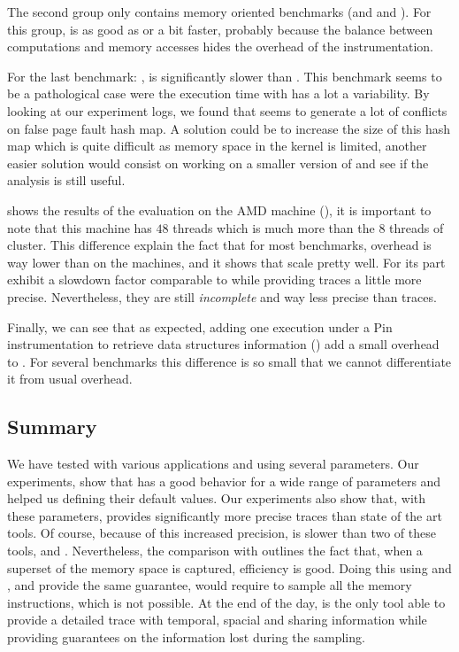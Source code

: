 The second group only contains memory oriented benchmarks (\DC and \FT and
\IS). For this group, \Moca is as good as \TABARNAC or a bit faster, probably
because the balance between computations and memory accesses hides the
overhead of the instrumentation.

For the last benchmark: \MG, \Moca is significantly slower than \TABARNAC. This benchmark
seems to be a pathological case were the execution time with \Moca has a lot a
variability. By looking at our experiment logs, we found that \MG seems to
generate a lot of conflicts on \Moca false page fault hash map. A solution
could be to increase the size of this hash map which is quite difficult as
memory space in the kernel is limited, another easier solution would consist on
working on a smaller version of \MG and see if the analysis is still useful.

 shows the results of the evaluation on the AMD machine
(\Stremi), it is important to note that this machine has $48$ threads which
is much more than the $8$ threads of \Edel cluster. This difference explain
the fact that for most benchmarks, \Moca overhead is way lower than on the
\Edel machines, and it shows that \Moca scale pretty well.
For its part \MemProf exhibit a slowdown factor comparable to \Mitos while
providing traces a little more precise. Nevertheless, they are still \emph{incomplete} and
way less precise than \Moca traces.

Finally, we can see that as expected, adding one execution under a Pin
instrumentation to retrieve data structures information (\MocaPin) add a small overhead
to \Moca. For several benchmarks this difference is so small that we cannot
differentiate it from \Moca usual overhead.

\subsection{Summary}
\label{sec:expe-cncl}

We have tested \Moca with various applications and using several parameters.
Our experiments, show that \Moca has a good behavior for a wide range of
parameters and helped us defining their default values. Our experiments also
show that, with these parameters, \Moca provides significantly more precise traces
than state of the art tools.
Of course, because of this increased precision, \Moca is slower than two of these tools,
\MemProf and \Mitos.
Nevertheless, the comparison with \TABARNAC outlines the fact that, when a superset of the memory
space is captured, \Moca efficiency is good.
Doing this using \MemProf and \Mitos, and provide the same guarantee, would require to sample all the memory instructions, which is not possible.
At the end of the day, \Moca is the only tool able to provide a
detailed trace with temporal, spacial and sharing information while providing
guarantees on the information lost during the sampling.
